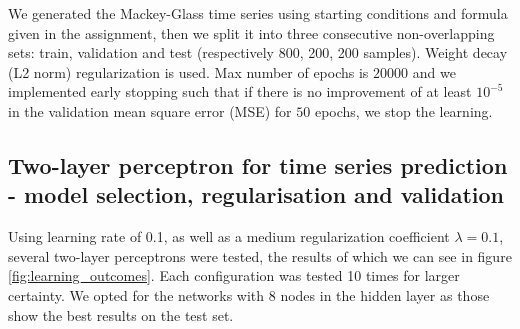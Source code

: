 \documentclass[a4paper]{article}
\begin{document}

We generated the Mackey-Glass time series using starting conditions and formula given in the assignment, then we split it into three consecutive non-overlapping sets: train, validation and test (respectively 800, 200, 200 samples). Weight decay (L2 norm) regularization is used. Max number of epochs is $20000$ and we implemented early stopping such that if there is no improvement of at least $10^{-5}$ in the validation mean square error (MSE) for $50$ epochs, we stop the learning.


\subsection{Two-layer perceptron for time series prediction - model selection, regularisation and validation}
Using learning rate of 0.1, as well as a medium regularization coefficient $\lambda = 0.1$, several two-layer perceptrons were tested, the results of which we can see in figure \ref{fig:learning_outcomes}. Each configuration was tested 10 times for larger certainty. We opted for the networks with 8 nodes in the hidden layer as those show the best results on the test set.
\end{document}
